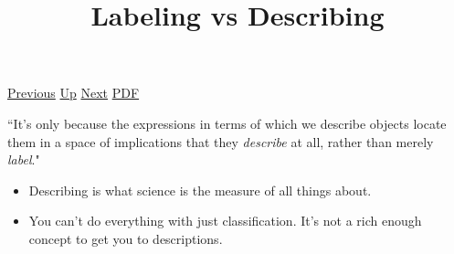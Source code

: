 \documentclass[12pt,a4paper]{report}
\begin{document}
 \href{doc/phil/People/Sellars/Quotes/Judgmentintheorderofexplanation.html}{Previous} 
 \href{doc/phil/People/Sellars/Quotes.html}{Up} 
 \href{doc/phil/People/Sellars/Quotes/Manasrationalanimal.html}{Next} 
 \href{doc/phil/People/Sellars/Quotes/LabelingvsDescribing.pdf}{PDF} 
\title{Labeling vs Describing}
``It's only because the expressions in terms of which we describe objects locate
them in a space of implications that they \emph{describe} at all, rather than
merely \emph{label}."

\begin{itemize}
    \item Describing is what science is the measure of all things about.
    \item You can't do everything with just classification. It's not a rich
         enough concept to get you to descriptions.
\end{itemize}
\end{document}
